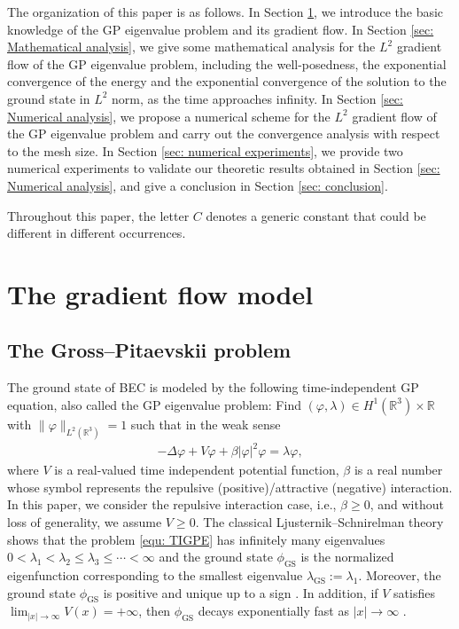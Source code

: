 \documentclass{siamart250211}
\def\R{\mathbb{R}}
\begin{document}
The organization of this paper is as follows. In Section \ref{sec: Preliminaries}, we introduce the basic knowledge of the GP eigenvalue problem and its gradient flow. In Section \ref{sec: Mathematical analysis}, we give some mathematical analysis for the $L^2$ gradient flow of the GP eigenvalue problem, including the well-posedness, the exponential convergence of the energy and the exponential convergence of the solution to the ground state in $L^2$ norm, as the time approaches infinity. In Section \ref{sec: Numerical analysis}, we propose a numerical scheme for the $L^2$ gradient flow of the GP eigenvalue problem and carry out the convergence analysis with respect to the mesh size. In Section \ref{sec: numerical experiments}, we provide two numerical experiments to validate our theoretic results obtained in Section \ref{sec: Numerical analysis}, and give a conclusion in Section \ref{sec: conclusion}.

Throughout this paper, the letter $C$ denotes a generic constant that could be different in different occurrences.

\section{The gradient flow model}\label{sec: Preliminaries}

\subsection{The Gross--Pitaevskii problem}\label{sec GP problem}

The ground state of BEC is modeled by the following time-independent GP equation, also called the GP eigenvalue problem: Find $(\varphi, \lambda) \in H^1(\R^3) \times \R$ with  $\|\varphi\|_{L^2(\R^3)} = 1$ such that in the weak sense
\begin{align}\label{equ: TIGPE}
	- \Delta \varphi + V\varphi + \beta |\varphi|^2\varphi = \lambda \varphi,
\end{align}
where $V$ is a real-valued time independent potential function, $\beta$ is a real number whose symbol represents the repulsive (positive)/attractive (negative) interaction. In this paper, we consider the repulsive interaction case, i.e., $\beta \ge 0$, and without loss of generality, we assume $V \ge 0$. The classical Ljusternik--Schnirelman theory \cite{zeidler1985nonlinear} shows that the problem \eqref{equ: TIGPE} has infinitely many eigenvalues $0 < \lambda_1 < \lambda_2 \le \lambda_3 \le \cdots < \infty$ and the ground state $\phi_{\text{GS}}$ is the normalized eigenfunction corresponding to the smallest eigenvalue $\lambda_{\text{GS}}:= \lambda_1$. Moreover, the ground state $\phi_{\text{GS}}$ is positive and unique up to a sign \cite{bao2013mathematical,cances2010numerical}. In addition, if $V$ satisfies $\lim_{|x| \to \infty} V(x) = + \infty$, then $\phi_{\text{GS}}$ decays exponentially fast as $|x| \to \infty$ \cite{bao2013mathematical}.
\end{document}
